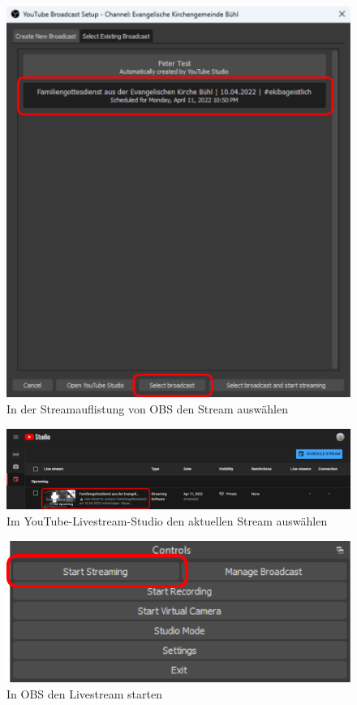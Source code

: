 \begin{figure}[H]
	\centering
	\includegraphics[width=\textwidth]{figures/obs-stream-select-list}
	
	\caption{In der Streamauflistung von OBS den Stream auswählen}
	\label{fig:obs:stream-select-list}
\end{figure}

\begin{figure}[H]
	\centering
	\includegraphics[width=\textwidth]{figures/youtube-livestream-studio}
	
	\caption{Im YouTube-Livestream-Studio den aktuellen Stream auswählen}
	\label{fig:youtube:livestream-studio}
\end{figure}

\begin{figure}[H]
	\centering
	\includegraphics[width=\textwidth]{figures/obs-interface-stream-start}
	
	\caption{In OBS den Livestream starten}
	\label{fig:obs:interface:stream-start}
\end{figure}

